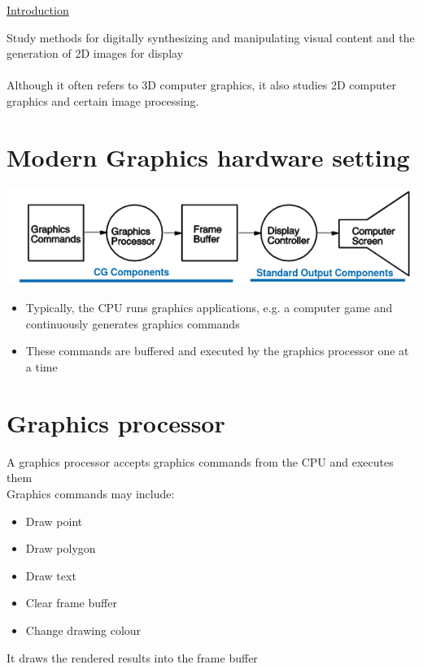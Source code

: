 \documentclass{article}[18pt]
\begin{document}
\begin{center}
\underline{\huge Introduction}
\end{center}
Study methods for digitally synthesizing and manipulating visual content and the generation of 2D images for display\\
\\
Although it often refers to 3D computer graphics, it also studies 2D computer graphics and certain image processing.
\section{Modern Graphics hardware setting}
\begin{center}
	\includegraphics[scale=0.7]{"general graphics system"}
\end{center}
\begin{itemize}
	\item Typically, the CPU runs graphics applications, e.g. a computer game and continuously generates graphics commands
	\item These commands are buffered and executed by the graphics processor one at a time
\end{itemize}
\section{Graphics processor}
A graphics processor accepts graphics commands from the CPU and executes them\\
Graphics commands may include:
\begin{itemize}
	\item Draw point
	\item Draw polygon
	\item Draw text
	\item Clear frame buffer
	\item Change drawing colour
\end{itemize}
It draws the rendered results into the frame buffer
\end{document}
